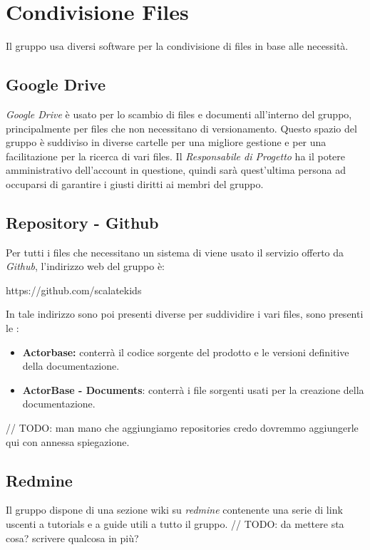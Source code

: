 \section{Condivisione Files}
Il gruppo usa diversi software per la condivisione di files in base alle necessità.

\subsection{Google Drive}
\textit{Google Drive} è usato per lo scambio di files e documenti all'interno del gruppo, principalmente per files che non necessitano di versionamento.
Questo spazio del gruppo è suddiviso in diverse cartelle per una migliore gestione e per una facilitazione per la ricerca di vari files.
Il \textit{Responsabile di Progetto} ha il potere amministrativo dell'account in questione, quindi sarà quest'ultima persona ad occuparsi di garantire i giusti diritti ai membri del gruppo.

\subsection{Repository - Github}
Per tutti i files che necessitano un sistema di  viene usato il servizio offerto da \textit{Github}, l'indirizzo web del gruppo è:
\begin{center}
https://github.com/scalatekids
\end{center}

In tale indirizzo sono poi presenti diverse  per suddividire i vari files, sono presenti le :
\begin{itemize}
  \item \textbf{Actorbase:} conterrà il codice sorgente del prodotto e le versioni definitive della documentazione.
  \item \textbf{ActorBase - Documents}: conterrà i file sorgenti usati per la creazione della documentazione.
\end{itemize}
	// TODO: man mano che aggiungiamo repositories credo dovremmo aggiungerle qui con annessa spiegazione.

\subsection{Redmine}
Il gruppo dispone di una sezione wiki su \textit{redmine} contenente una serie di link uscenti a tutorials e a guide utili a tutto il gruppo.
// TODO: da mettere sta cosa? scrivere qualcosa in più?

